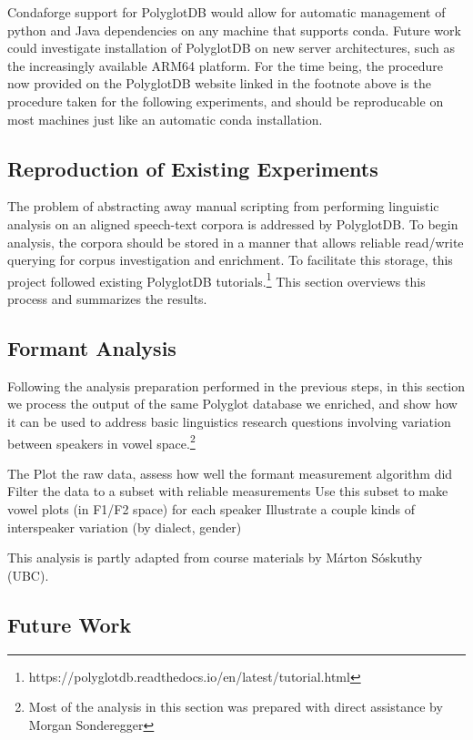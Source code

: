\documentclass[11pt]{article}
\begin{document}
Condaforge support for PolyglotDB would allow for automatic management of python and Java dependencies on any machine that supports conda. Future work could investigate installation of PolyglotDB on new server architectures, such as the increasingly available ARM64 platform. For the time being, the procedure now provided on the PolyglotDB website linked in the footnote above is the procedure taken for the following experiments, and should be reproducable on most machines just like an automatic conda installation. 

\subsection{Reproduction of Existing Experiments}

The problem of abstracting away manual scripting from performing linguistic analysis on an aligned speech-text corpora is addressed by PolyglotDB. To begin analysis, the corpora should be stored in a manner that allows reliable read/write querying for corpus investigation and enrichment. To facilitate this storage, this project followed existing PolyglotDB tutorials.\footnote{https://polyglotdb.readthedocs.io/en/latest/tutorial.html} This section overviews this process and summarizes the results.

\subsection{Formant Analysis}

Following the analysis preparation performed in the previous steps, in this section we process the output of the same Polyglot database we enriched, and show how it can be used to address basic linguistics research questions involving variation between speakers in vowel space.\footnote{Most of the analysis in this section was prepared with direct assistance by Morgan Sonderegger}

The Plot the raw data, assess how well the formant measurement algorithm did
    Filter the data to a subset with reliable measurements
    Use this subset to make vowel plots (in F1/F2 space) for each speaker
    Illustrate a couple kinds of interspeaker variation (by dialect, gender)

This analysis is partly adapted from course materials by Márton Sóskuthy (UBC).

\subsection{Future Work}
\end{document}
